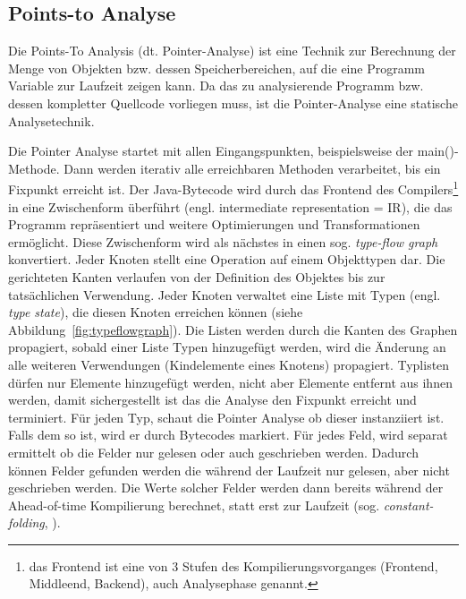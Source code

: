 \subsection{Points-to Analyse}
\label{subsec:pointsto}

Die Points-To Analysis (dt. Pointer-Analyse) ist eine Technik zur Berechnung der Menge von Objekten bzw. dessen Speicherbereichen, auf die eine Programm Variable zur Laufzeit zeigen kann\parencite{Hind2001, Smaragdakis2015}. 
Da das zu analysierende Programm bzw. dessen kompletter Quellcode vorliegen muss, ist die Pointer-Analyse eine statische Analysetechnik.

Die Pointer Analyse startet mit allen Eingangspunkten, beispielsweise der main()-Methode. Dann werden iterativ alle erreichbaren Methoden verarbeitet, bis ein Fixpunkt erreicht ist. 
Der Java-Bytecode wird durch das Frontend des Compilers\footnote{das Frontend ist eine von 3 Stufen des Kompilierungsvorganges (Frontend, Middleend, Backend), auch Analysephase genannt.} in eine Zwischenform 
überführt (engl. intermediate representation = IR), die das Programm repräsentiert und weitere Optimierungen und Transformationen ermöglicht\parencite{Simon2015}. Diese Zwischenform wird als nächstes in einen 
sog. \textit{type-flow graph} konvertiert. Jeder Knoten stellt eine Operation auf einem Objekttypen dar. Die gerichteten Kanten verlaufen von der Definition des Objektes bis zur tatsächlichen Verwendung. 
Jeder Knoten verwaltet eine Liste mit Typen (engl. \textit{type state}), die diesen Knoten erreichen können (siehe Abbildung~\ref{fig:typeflowgraph}). Die Listen werden durch die Kanten des Graphen propagiert,
 sobald einer Liste Typen hinzugefügt werden, wird die Änderung an alle weiteren Verwendungen (Kindelemente eines Knotens) propagiert. Typlisten dürfen nur Elemente hinzugefügt werden, nicht aber Elemente 
 entfernt aus ihnen werden, damit sichergestellt ist das die Analyse den Fixpunkt erreicht und terminiert. Für jeden Typ, schaut die Pointer Analyse ob  dieser instanziiert ist. Falls dem so ist, wird er 
 durch Bytecodes markiert. Für jedes Feld, wird separat ermittelt ob die Felder nur gelesen oder auch geschrieben werden. Dadurch können Felder gefunden werden die während der Laufzeit nur gelesen, aber nicht
 geschrieben werden\parencite{Wimmer2019}. Die Werte solcher Felder werden dann bereits während der Ahead-of-time Kompilierung berechnet, statt erst zur Laufzeit (sog. \textit{constant-folding}, \parencite[Kapitel 4.2]{Grumberg2014}).

